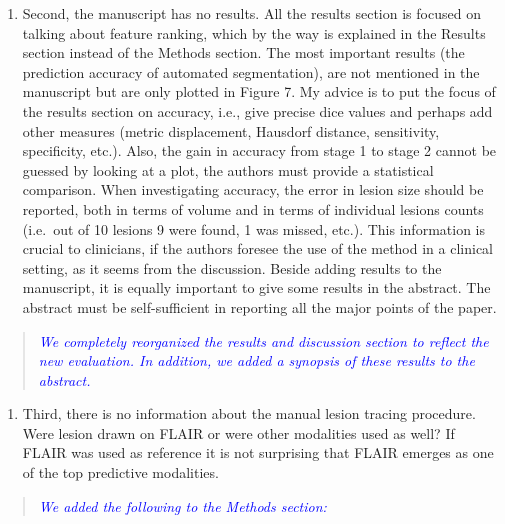 \documentclass[12pt,]{article}
\providecommand{\tightlist}{%
  \setlength{\itemsep}{0pt}\setlength{\parskip}{0pt}}
\begin{document}
\begin{enumerate}
\def\labelenumi{\arabic{enumi}.}
\setcounter{enumi}{1}
\tightlist
\item
  Second, the manuscript has no results. All the results section is
  focused on talking about feature ranking, which by the way is
  explained in the Results section instead of the Methods section. The
  most important results (the prediction accuracy of automated
  segmentation), are not mentioned in the manuscript but are only
  plotted in Figure 7. My advice is to put the focus of the results
  section on accuracy, i.e., give precise dice values and perhaps add
  other measures (metric displacement, Hausdorf distance, sensitivity,
  specificity, etc.). Also, the gain in accuracy from stage 1 to stage 2
  cannot be guessed by looking at a plot, the authors must provide a
  statistical comparison. When investigating accuracy, the error in
  lesion size should be reported, both in terms of volume and in terms
  of individual lesions counts (i.e.~out of 10 lesions 9 were found, 1
  was missed, etc.). This information is crucial to clinicians, if the
  authors foresee the use of the method in a clinical setting, as it
  seems from the discussion. Beside adding results to the manuscript, it
  is equally important to give some results in the abstract. The
  abstract must be self-sufficient in reporting all the major points of
  the paper.
\end{enumerate}

\begin{quote}
\emph{\textcolor{blue}{We completely reorganized the results and discussion
section to reflect the new evaluation.  In addition, we added a synopsis
of these results to the abstract.}}
\end{quote}

\begin{enumerate}
\def\labelenumi{\arabic{enumi}.}
\setcounter{enumi}{2}
\tightlist
\item
  Third, there is no information about the manual lesion tracing
  procedure. Were lesion drawn on FLAIR or were other modalities used as
  well? If FLAIR was used as reference it is not surprising that FLAIR
  emerges as one of the top predictive modalities.
\end{enumerate}

\begin{quote}
\emph{\textcolor{blue}{We added the following to the Methods section:}}
\end{quote}
\end{document}
